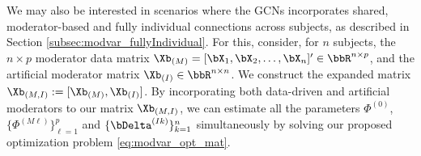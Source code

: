 We may also be interested in scenarios where the GCNs incorporates shared, moderator-based and fully individual connections across subjects, as described in Section \ref{subsec:modvar_fullyIndividual}. For this, consider, for $n$ subjects, the $n\times p$ moderator data matrix $\Xb_{(M)} = [\bX_1, \bX_2,\ldots,\bX_n]'\in \bbR^{n\times p}$, and the artificial moderator matrix $\Xb_{(I)}\in\bbR^{n\times n}$. We construct the expanded matrix $\Xb_{(M,I)} := [  \Xb_{(M)} , \Xb_{(I)} ]$. By incorporating both data-driven and artificial moderators to our matrix $\Xb_{(M,I)}$, we can estimate all the parameters $\Phi^{(0)}$, $\{\Phi^{(M\ell)}\}_{\ell = 1}^p$ and $\{\bDelta^{(Ik)}\}_{k=1}^n$ simultaneously by solving our proposed optimization problem \eqref{eq:modvar_opt_mat}.

